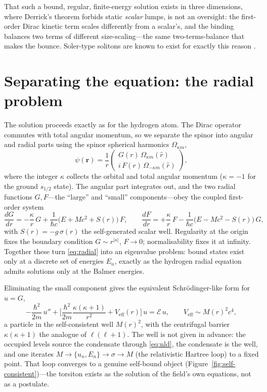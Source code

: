 That such a bound, regular, finite-energy solution exists in three dimensions, where Derrick's
theorem forbids static \emph{scalar} lumps, is not an oversight: the first-order Dirac kinetic
term scales differently from a scalar's, and the binding balances two terms of different
size-scaling---the same two-terms-balance that makes the bounce. Soler-type solitons are known
to exist for exactly this reason \citep{soler1970}.

\section{Separating the equation: the radial problem}
\label{sec:radial}

The solution proceeds exactly as for the hydrogen atom. The Dirac operator commutes with total
angular momentum, so we separate the spinor into angular and radial parts using the spinor
spherical harmonics $\Omega_{\kappa m}$,
\begin{equation}
  \psi(\mathbf r) = \frac{1}{r}\begin{pmatrix} G(r)\,\Omega_{\kappa m}(\hat r) \\[2pt]
                                    i\,F(r)\,\Omega_{-\kappa m}(\hat r)\end{pmatrix},
\end{equation}
where the integer $\kappa$ collects the orbital and total angular momentum ($\kappa=-1$ for the
ground $s_{1/2}$ state). The angular part integrates out, and the two radial functions
$G,F$---the ``large'' and ``small'' components---obey the coupled first-order system
\begin{equation}
  \frac{dG}{dr} = -\frac{\kappa}{r}\,G + \frac{1}{\hbar c}\big(E + Mc^2 + S(r)\big)\,F,
  \qquad
  \frac{dF}{dr} = +\frac{\kappa}{r}\,F - \frac{1}{\hbar c}\big(E - Mc^2 - S(r)\big)\,G,
  \label{eq:radial}
\end{equation}
with $S(r)=-g\,\sigma(r)$ the self-generated scalar well. Regularity at the origin fixes the
boundary condition $G\sim r^{|\kappa|}$, $F\to0$; normalisability fixes it at infinity. Together
these turn \eqref{eq:radial} into an eigenvalue problem: bound states exist only at a discrete
set of energies $E_n$, exactly as the hydrogen radial equation admits solutions only at the
Balmer energies.

Eliminating the small component gives the equivalent Schr\"odinger-like form for $u=G$,
\begin{equation}
  -\frac{\hbar^2}{2m}\,u'' + \Big[\frac{\hbar^2}{2m}\frac{\kappa(\kappa+1)}{r^2}
      + V_{\mathrm{eff}}(r)\Big]\,u = \mathcal{E}\,u,
  \qquad V_{\mathrm{eff}}\sim M(r)^2 c^4,
  \label{eq:schrodinger}
\end{equation}
a particle in the self-consistent well $M(r)^2$, with the centrifugal barrier $\kappa(\kappa+1)$
the analogue of $\ell(\ell+1)$. The well is not given in advance: the occupied levels source the
condensate through \eqref{eq:nld}, the condensate is the well, and one iterates
$M\!\to\!\{u_n,E_n\}\!\to\!\sigma\!\to\!M$ (the relativistic Hartree loop) to a fixed point. That
loop converges to a genuine self-bound object (Figure~\ref{fig:self-consistent})---the torsiton
exists as the solution of the field's own equations, not as a postulate.

